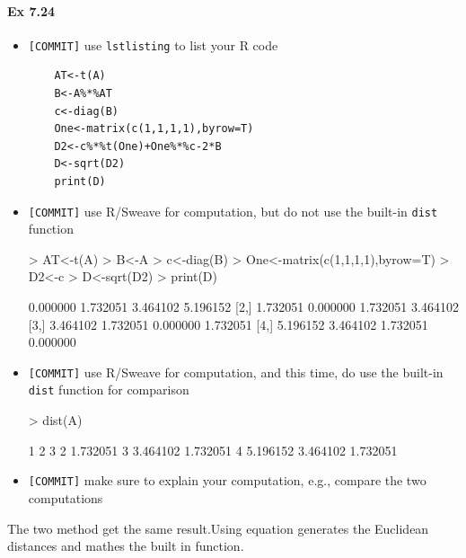 \documentclass[12pt]{article}
\begin{document}
\paragraph{Ex 7.24}
\begin{itemize}
    \item \verb+[COMMIT]+ use \verb+lstlisting+ to list your R code
    \begin{lstlisting}
    AT<-t(A)
    B<-A%*%AT
    c<-diag(B)
    One<-matrix(c(1,1,1,1),byrow=T)
    D2<-c%*%t(One)+One%*%c-2*B
    D<-sqrt(D2)
    print(D)
    \end{lstlisting}    
    
    \item \verb+[COMMIT]+ use R/Sweave for computation, but do not use the built-in \verb+dist+
        function
\begin{Schunk}
\begin{Sinput}
> AT<-t(A)
> B<-A%
> c<-diag(B)
> One<-matrix(c(1,1,1,1),byrow=T)
> D2<-c%
> D<-sqrt(D2)
> print(D)
\end{Sinput}
\begin{Soutput}
         [,1]     [,2]     [,3]     [,4]
[1,] 0.000000 1.732051 3.464102 5.196152
[2,] 1.732051 0.000000 1.732051 3.464102
[3,] 3.464102 1.732051 0.000000 1.732051
[4,] 5.196152 3.464102 1.732051 0.000000
\end{Soutput}
\end{Schunk}

    \item \verb+[COMMIT]+ use R/Sweave for computation, and this time, do use the built-in \verb+dist+
        function for comparison
\begin{Schunk}
\begin{Sinput}
> dist(A)
\end{Sinput}
\begin{Soutput}
         1        2        3
2 1.732051                  
3 3.464102 1.732051         
4 5.196152 3.464102 1.732051
\end{Soutput}
\end{Schunk}
    \item \verb+[COMMIT]+ make sure to explain your computation, e.g., compare the two
        computations
\end{itemize}
The two method get the same result.Using equation generates the Euclidean distances and mathes the built in function.
\end{document}
